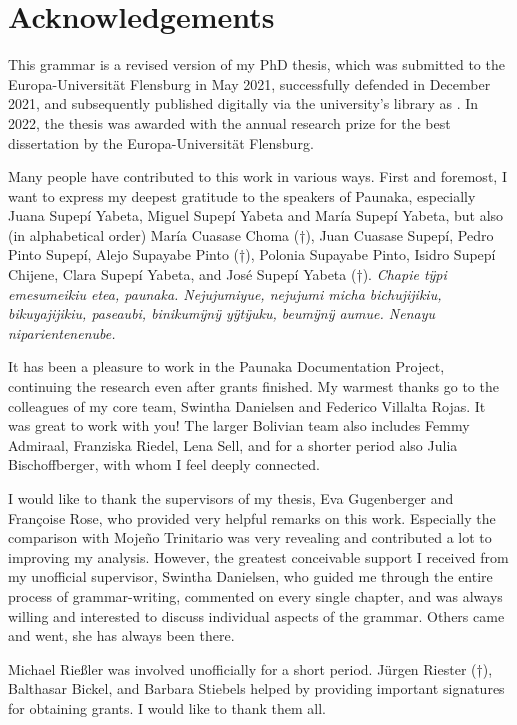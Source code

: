 \chapter*{Acknowledgements}\label{sec:thanks}

This grammar is a revised version of my PhD thesis, which was submitted to the Europa-Universität Flensburg in May 2021, successfully defended in December 2021, and subsequently published digitally via the university’s library as \citet{Terhart2022}. In 2022, the thesis was awarded with the annual research prize for the best dissertation by the Europa-Universität Flensburg.

Many people have contributed to this work in various ways. First and foremost, I want to express my deepest gratitude to the speakers of Paunaka, especially Juana Supepí Yabeta, Miguel Supepí Yabeta and María Supepí Yabeta, but also (in alphabetical order) María Cuasase Choma (†), Juan Cuasase Supepí, Pedro Pinto Supepí, Alejo Supayabe Pinto (†), Polonia Supayabe Pinto, Isidro Supepí Chijene, Clara Supepí Yabeta, and José Supepí Yabeta (†). \textit{Chapie tÿpi emesumeikiu etea, paunaka. Nejujumiyue, nejujumi micha bichujijikiu, bikuyajijikiu, paseaubi, binikumÿnÿ yÿtÿuku, beumÿnÿ aumue. Nenayu niparientenenube.}

It has been a pleasure to work in the Paunaka Documentation Project, continuing the research even after grants finished. My warmest thanks go to the colleagues of my core team, Swintha Danielsen and Federico Villalta Rojas. It was great to work with you! The larger Bolivian team also includes Femmy Admiraal, Franziska Riedel, Lena Sell, and for a shorter period also Julia Bischoffberger, with whom I feel deeply connected.

I would like to thank the supervisors of my thesis, Eva Gugenberger and Françoise Rose, who provided very helpful remarks on this work. Especially the comparison with Mojeño Trinitario was very revealing and contributed a lot to improving my analysis. However, the greatest conceivable support I received from my unofficial supervisor, Swintha Danielsen, who guided me through the entire process of grammar-writing, commented on every single chapter, and was always willing and interested to discuss individual aspects of the grammar. Others came and went, she has always been there. 

Michael Rießler was involved unofficially for a short period. Jürgen Riester (†), Balthasar Bickel, and Barbara Stiebels helped by providing important signatures for obtaining grants. I would like to thank them all.

